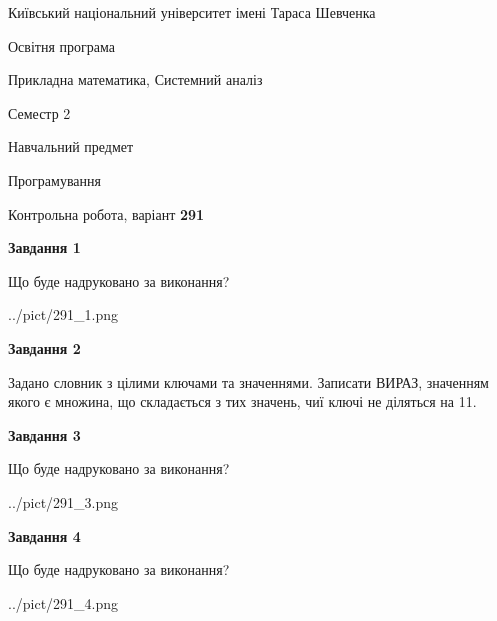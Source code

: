 \documentclass[12pt, ukrainian]{article}
\begin{document}
{{\begin {small}\par
{ \center  Київський національний університет імені Тараса Шевченка \par}
{\parbox {5 cm}{Освітня програма \hfill}{\parbox {8 cm}{Прикладна математика, Системний аналіз \hfill}}\parbox {5 cm}{\hfill Семестр 2}}\par
{\parbox {5 cm} {Навчальний предмет \hfill}\parbox {7 cm}{Програмування \hfill}\parbox {6cm}{\hfill}\par}\vspace{-7pt} \end{small}}{\center Контрольна робота, варіант  \No \textbf
{ 291 }\par}}
{
\begin {large}
{\begin {center}\textbf{Завдання 1}\end {center}}\par
Що буде надруковано за виконання?\par\par
\begin{center}
	{../pict/291_1.png}
\end{center}
\newpage

{\begin {center}\textbf{Завдання 2}\end {center}}\par
Задано словник  з цілими ключами та значеннями. Записати ВИРАЗ, значенням якого є множина, що складається  з тих значень, чиї ключі не діляться на 11.\par
\newpage

{\begin {center}\textbf{Завдання 3}\end {center}}\par
Що буде надруковано за виконання?
\begin{center}
	{../pict/291_3.png}
\end{center}
\newpage

{\begin {center}\textbf{Завдання 4}\end {center}}\par
Що буде надруковано за виконання?\par
\begin{center}
	{../pict/291_4.png}
\end{center}
\newpage


\end{large}}
\end{document}
